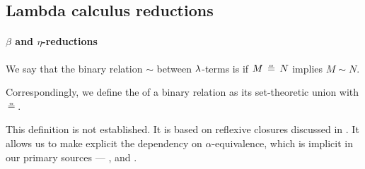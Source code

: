 \subsection{Lambda calculus reductions}\label{subsec:lambda_calculus_reductions}

\paragraph{\( \beta \) and \( \eta \)-reductions}

\begin{definition}\label{def:alpha_reflexive}\mimprovised
  We say that the binary relation \( {\sim} \) between \( \mathrm{\lambda} \)-terms is  if \( M \aequiv N \) implies \( M \sim N \).

  Correspondingly, we define the  of a binary relation as its set-theoretic union with \( {\aequiv} \).
\end{definition}
\begin{comments}
  \item This definition is not established. It is based on reflexive closures discussed in . It allows us to make explicit the dependency on \( \alpha \)-equivalence, which is implicit in our primary sources --- \cite[ch. 3]{Barendregt1984}, \cite[1B2]{Hindley1997} and \cite[191]{Герасимов2011}.
\end{comments}

